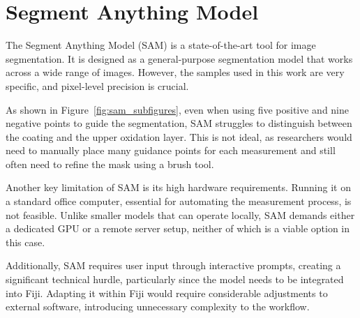 \section{Segment Anything Model} \label{sec:sam}

The Segment Anything Model (SAM) \cite{kirillov2023segany} is a state-of-the-art tool for image segmentation. It is designed as a general-purpose segmentation model that works across a wide range of images. However, the samples used in this work are very specific, and pixel-level precision is crucial.

As shown in Figure~\ref{fig:sam_subfigures}, even when using five positive and nine negative points to guide the segmentation, SAM struggles to distinguish between the coating and the upper oxidation layer. This is not ideal, as researchers would need to manually place many guidance points for each measurement and still often need to refine the mask using a brush tool.

Another key limitation of SAM is its high hardware requirements. Running it on a standard office computer, essential for automating the measurement process, is not feasible. Unlike smaller models that can operate locally, SAM demands either a dedicated GPU or a remote server setup, neither of which is a viable option in this case.

Additionally, SAM requires user input through interactive prompts, creating a significant technical hurdle, particularly since the model needs to be integrated into Fiji. Adapting it within Fiji would require considerable adjustments to external software, introducing unnecessary complexity to the workflow.


